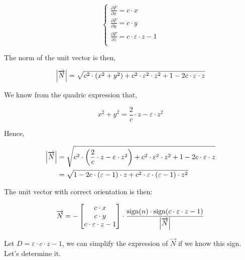 \begin{equation} \begin{cases}
\frac{\partial F}{\partial x} = c \cdot x\\
\frac{\partial F}{\partial y} = c \cdot y\\
\frac{\partial F}{\partial z} = c \cdot \varepsilon \cdot z - 1\\
\end{cases} \end{equation}

The norm of the unit vector is then,

\begin{equation}
\abs{\overrightarrow{N}} =
\sqrt{c^2 \cdot (x^2 + y^2) + c^2 \cdot \varepsilon^2
  \cdot z^2 + 1 - 2 c \cdot \varepsilon \cdot z} \\
\end{equation}

We know from the quadric expression that,

\begin{equation}
x^2 + y^2 = \frac{2}{c} \cdot z - \varepsilon \cdot z^2
\end{equation}

Hence,

\begin{equation} \begin{split}
\abs{\overrightarrow{N}} &=
\sqrt{c^2 \cdot \left( \frac{2}{c} \cdot z - \varepsilon \cdot z^2 \right)
  + c^2 \cdot \varepsilon^2 \cdot z^2 + 1 - 2 c \cdot \varepsilon \cdot z} \\
&= \sqrt{1 - 2 c \cdot (\varepsilon - 1) \cdot z + c^2 \cdot \varepsilon \cdot
         (\varepsilon - 1) \cdot z^2}
\end{split} \end{equation}

The unit vector with correct orientation is then:

\begin{equation}
\overrightarrow{N} = -
\begin{bmatrix}
c \cdot x \\ c \cdot y \\ c \cdot \varepsilon \cdot z - 1
\end{bmatrix} \cdot
\frac{\textrm{sign}(n) \cdot \textrm{sign}(c \cdot \varepsilon \cdot z - 1)}
{\abs{\overrightarrow{N}}}
\end{equation}

Let $D = \varepsilon \cdot c \cdot z - 1$, we can simplify the expression
of $\overrightarrow{N}$ if we know this sign. Let's determine it.

